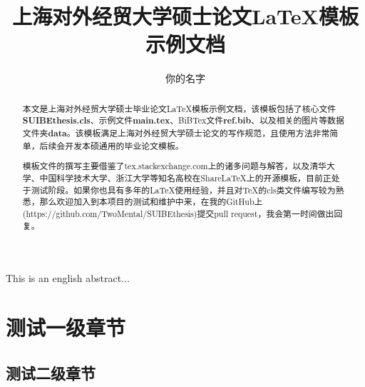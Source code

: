 \documentclass{SUIBEthesis}
\begin{document}
\title{上海对外经贸大学硕士论文\LaTeX 模板示例文档}
\author{你的名字}


\maketitle

\newpage

\begin{abstract}
  本文是上海对外经贸大学硕士毕业论文\LaTeX 模板示例文档，该模板包括了核心文件\textbf{SUIBEthesis.cls}、示例文件\textbf{main.tex}、BiBTex文件\textbf{ref.bib}、以及相关的图片等数据文件夹\textbf{data}。该模板满足上海对外经贸大学硕士论文的写作规范，且使用方法非常简单，后续会开发本硕通用的毕业论文模板。

  模板文件的撰写主要借鉴了tex.stackexchange.com上的诸多问题与解答，以及清华大学、中国科学技术大学、浙江大学等知名高校在ShareLaTeX上的开源模板，目前正处于测试阶段。如果你也具有多年的\LaTeX 使用经验，并且对\TeX 的cls类文件编写较为熟悉，那么欢迎加入到本项目的测试和维护中来，在我的GitHub上(https://github.com/TwoMental/SUIBEthesis)提交pull request，我会第一时间做出回复。

  
  
\end{abstract}


\newpage
\begin{enabstract}
  
\end{enabstract}

This is an english abstract...



\newpage
\pagestyle{empty}
\tableofcontents
\pagestyle{empty}
\thispagestyle{coverpage}


\newpage
\setcounter{page}{1}
\pagestyle{mainpage}





\section{测试一级章节}
\subsection{测试二级章节}
\end{document}
